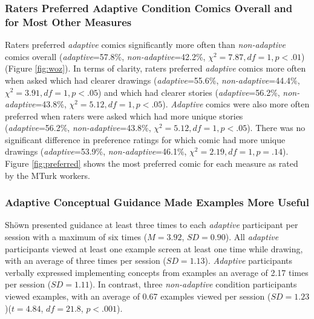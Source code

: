 \subsubsection{Raters Preferred Adaptive Condition Comics Overall and for Most Other Measures}
Raters preferred \textit{adaptive} comics significantly more often than \textit{non-adaptive} comics overall (\textit{adaptive}=57.8\%, \textit{non-adaptive}=42.2\%, $
\chi^2=7.87, df=1, p<.01$) (Figure \ref{fig:woz}). In terms of clarity, raters preferred \textit{adaptive} comics more often when asked which had clearer drawings (\textit{adaptive}=55.6\%, \textit{non-adaptive}=44.4\%, $\chi^2=3.91, df=1, p<.05$) and which had clearer stories (\textit{adaptive}=56.2\%, \textit{non-adaptive}=43.8\%, $\chi^2=5.12, df=1, p<.05$). \textit{Adaptive} comics were also more often preferred when raters were asked which had more unique stories (\textit{adaptive}=56.2\%, \textit{non-adaptive}=43.8\%, $\chi^2=5.12, df=1, p<.05$). There was no significant difference in preference ratings for which comic had more unique drawings (\textit{adaptive}=53.9\%, \textit{non-adaptive}=46.1\%, $\chi^2=2.19, df=1, p=.14$). 
Figure \ref{fig:preferred} shows the most preferred comic for each measure as rated by the MTurk workers.

\subsubsection{Adaptive Conceptual Guidance Made Examples More Useful}
Sh{\"o}wn presented guidance at least three times to each \textit{adaptive} participant per session with a maximum of six times ($M=3.92$, $SD=0.90$). All \textit{adaptive} participants viewed at least one example screen at least one time while drawing, with an average of three times per session ($SD=1.13$). \textit{Adaptive} participants verbally expressed implementing concepts from examples an average of 2.17 times per session  ($SD=1.11$). In contrast, three \textit{non-adaptive} condition participants viewed examples, with an average of 0.67 examples viewed per session ($SD=1.23$)($t=4.84$, $df=21.8$, $p<.001$). 

